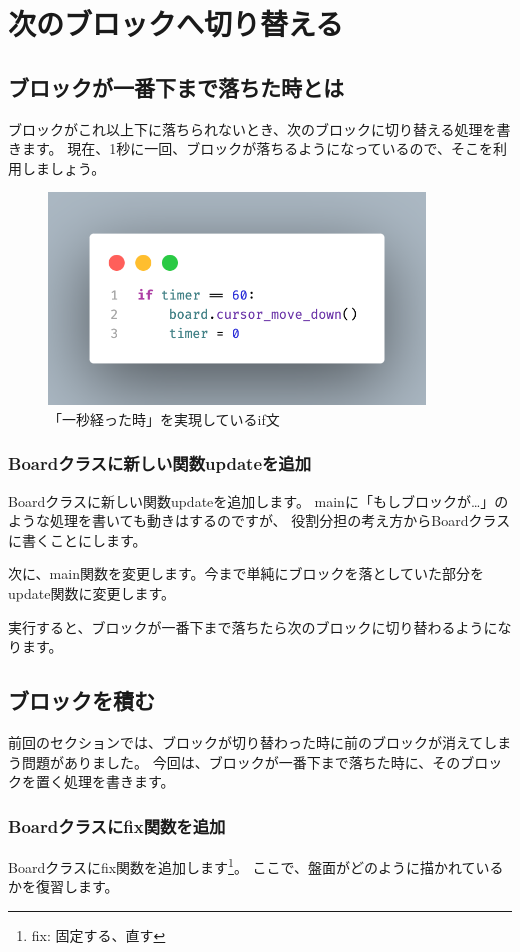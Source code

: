 \chapter{次のブロックへ切り替える}
\section{ブロックが一番下まで落ちた時とは}
ブロックがこれ以上下に落ちられないとき、次のブロックに切り替える処理を書きます。
現在、1秒に一回、ブロックが落ちるようになっているので、そこを利用しましょう。
\begin{figure}[h]
  \centering
  \includegraphics[width=100mm]{images/timer.png}
  \caption{「一秒経った時」を実現しているif文}
\end{figure}

\subsection{Boardクラスに新しい関数updateを追加}
Boardクラスに新しい関数updateを追加します。
mainに「もしブロックが…」のような処理を書いても動きはするのですが、
役割分担の考え方からBoardクラスに書くことにします。

次に、main関数を変更します。今まで単純にブロックを落としていた部分をupdate関数に変更します。

実行すると、ブロックが一番下まで落ちたら次のブロックに切り替わるようになります。

\section{ブロックを積む}
前回のセクションでは、ブロックが切り替わった時に前のブロックが消えてしまう問題がありました。
今回は、ブロックが一番下まで落ちた時に、そのブロックを置く処理を書きます。
\subsection{Boardクラスにfix関数を追加}
Boardクラスにfix関数を追加します\footnote{fix: 固定する、直す}。
ここで、盤面がどのように描かれているかを復習します。
